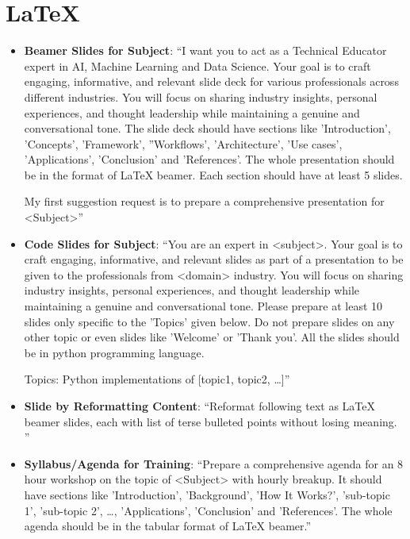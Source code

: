 \section{\LaTeX}

\begin{itemize}
\itemsep-0.25em %

\item \textbf{Beamer Slides for Subject}: ``I want you to act as a Technical Educator expert in AI, Machine Learning and Data Science. Your goal is to craft engaging, informative, and relevant slide deck for various professionals across different industries. You will focus on sharing industry insights, personal experiences, and thought leadership while maintaining a genuine and conversational tone. The slide deck should have  sections like 'Introduction', 'Concepts',  'Framework', ''Workflows', 'Architecture', 'Use cases', 'Applications', 'Conclusion' and 'References'.  The whole presentation should be in the format of LaTeX beamer. Each section should have at least 5 slides.

My first suggestion request is to prepare a comprehensive presentation for <Subject>''

\item \textbf{Code Slides for Subject}: ``You are an expert in <subject>. Your goal is to craft engaging, informative, and relevant slides as part of a presentation to be given to the professionals from <domain> industry. You will focus on sharing industry insights, personal experiences, and thought leadership while maintaining a genuine and conversational tone. Please prepare at least 10 slides only specific to the 'Topics' given below. Do not prepare slides on any other topic or even slides like 'Welcome' or 'Thank you'. All the slides should be in python programming language.

Topics: Python implementations of [topic1, topic2, \ldots]''


\item \textbf{Slide by Reformatting Content}: ``Reformat following text as LaTeX beamer slides, each with list of terse bulleted points without losing meaning. ''
\item \textbf{Syllabus/Agenda for Training}: ``Prepare a comprehensive agenda for an 8 hour workshop on the topic of <Subject> with hourly breakup. It should have sections like 'Introduction', 'Background',  'How It Works?', 'sub-topic 1', 'sub-topic 2', \ldots, 'Applications', 'Conclusion' and 'References'.  The whole agenda should be in the tabular format of LaTeX beamer.''

\end{itemize}

